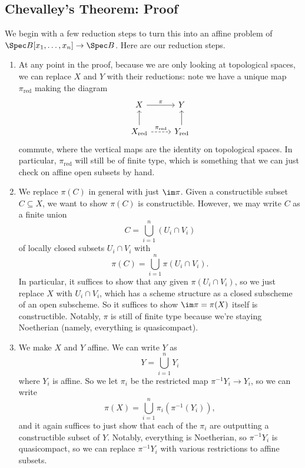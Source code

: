 \documentclass[../notes.tex]{subfiles}
\begin{document}
\subsection{Chevalley's Theorem: Proof}
We begin with a few reduction steps to turn this into an affine problem of $\Spec B[x_1,\ldots,x_n]\to\Spec B$. Here are our reduction steps.
\begin{enumerate}
	\item At any point in the proof, because we are only looking at topological spaces, we can replace $X$ and $Y$ with their reductions: note we have a unique map $\pi_{\mathrm{red}}$ making the diagram
	\[\begin{tikzcd}
		X & Y \\
		{X_{\mathrm{red}}} & {Y_{\mathrm{red}}}
		\arrow["\pi", from=1-1, to=1-2]
		\arrow["{\pi_{\mathrm{red}}}", dashed, from=2-1, to=2-2]
		\arrow[from=2-1, to=1-1]
		\arrow[from=2-2, to=1-2]
	\end{tikzcd}\]
	commute, where the vertical maps are the identity on topological spaces. In particular, $\pi_{\mathrm{red}}$ will still be of finite type, which is something that we can just check on affine open subsets by hand.
	\item We replace $\pi(C)$ in general with just $\im\pi$. Given a constructible subset $C\subseteq X$, we want to show $\pi(C)$ is constructible. However, we may write $C$ as a finite union
	\[C=\bigcup_{i=1}^n(U_i\cap V_i)\]
	of locally closed subsets $U_i\cap V_i$ with
	\[\pi(C)=\bigcup_{i=1}^n\pi(U_i\cap V_i).\]
	In particular, it suffices to show that any given $\pi(U_i\cap V_i)$, so we just replace $X$ with $U_i\cap V_i$, which has a scheme structure as a closed subscheme of an open subscheme. So it suffices to show $\im\pi=\pi(X)$ itself is constructible. Notably, $\pi$ is still of finite type because we're staying Noetherian (namely, everything is quasicompact).
	\item We make $X$ and $Y$ affine. We can write $Y$ as
	\[Y=\bigcup_{i=1}^nY_i\]
	where $Y_i$ is affine. So we let $\pi_i$ be the restricted map $\pi^{-1}Y_i\to Y_i$, so we can write
	\[\pi(X)=\bigcup_{i=1}^n\pi_i\left(\pi^{-1}(Y_i)\right),\]
	and it again suffices to just show that each of the $\pi_i$ are outputting a constructible subset of $Y$. Notably, everything is Noetherian, so $\pi^{-1}Y_i$ is quasicompact, so we can replace $\pi^{-1}Y_i$ with various restrictions to affine subsets.

\end{enumerate}
\end{document}
